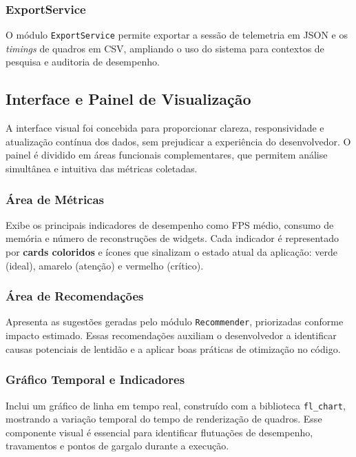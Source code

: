 \subsubsection{ExportService}

O módulo \texttt{ExportService} permite exportar a sessão de telemetria em JSON e os \textit{timings} de quadros em CSV, ampliando o uso do sistema para contextos de pesquisa e auditoria de desempenho.

\subsection{Interface e Painel de Visualização}

A interface visual foi concebida para proporcionar clareza, responsividade e atualização contínua dos dados, sem prejudicar a experiência do desenvolvedor.
O painel é dividido em áreas funcionais complementares, que permitem análise simultânea e intuitiva das métricas coletadas.

\subsubsection{Área de Métricas}

Exibe os principais indicadores de desempenho como FPS médio, consumo de memória e número de reconstruções de widgets.
Cada indicador é representado por \textbf{cards coloridos} e ícones que sinalizam o estado atual da aplicação: verde (ideal), amarelo (atenção) e vermelho (crítico).

\subsubsection{Área de Recomendações}

Apresenta as sugestões geradas pelo módulo \texttt{Recommender}, priorizadas conforme impacto estimado.
Essas recomendações auxiliam o desenvolvedor a identificar causas potenciais de lentidão e a aplicar boas práticas de otimização no código.

\subsubsection{Gráfico Temporal e Indicadores}

Inclui um gráfico de linha em tempo real, construído com a biblioteca \texttt{fl\_chart}, mostrando a variação temporal do tempo de renderização de quadros.
Esse componente visual é essencial para identificar flutuações de desempenho, travamentos e pontos de gargalo durante a execução.

